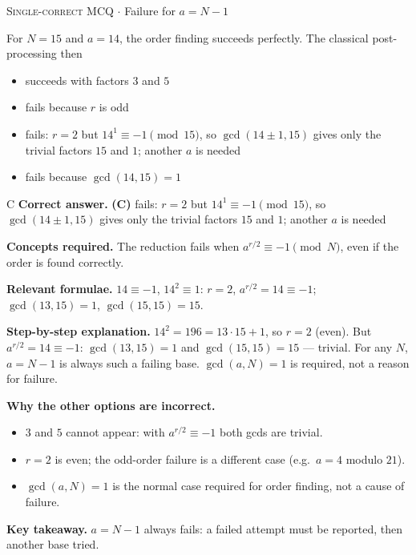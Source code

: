 \documentclass[11pt,a4paper]{article}
\newcommand{\optlabel}[1]{\textbf{(#1)}}
\newcommand{\correctlabel}[1]{\textcolor{okgreen}{\textbf{(#1)}\,\ding{51}}}
\newenvironment{qitem}[1]{\begin{list}{}{\setlength{\leftmargin}{3.3em}\setlength{\labelwidth}{3.1em}%
  \setlength{\labelsep}{0.2em}\setlength{\topsep}{3pt}\setlength{\parsep}{3pt}}\item[\textbf{Q.#1}\hfill]}{\end{list}}
\newcommand{\qsep}{\par\vspace{2pt}{\color{black!15}\hrule}\vspace{4pt}}
\newcommand{\qmeta}[2]{{\footnotesize\color{black!60}\textsc{#1} \;$\cdot$\; #2}\par}
\begin{document}
\begin{qitem}{43}
\qmeta{Single-correct MCQ}{Failure for $a = N - 1$}
For $N = 15$ and $a = 14$, the order finding succeeds perfectly. The classical post-processing then
\begin{itemize}[leftmargin=2.6em, labelsep=0.4em, itemsep=2pt, topsep=3pt]
\item[\optlabel{A}] succeeds with factors $3$ and $5$
\item[\optlabel{B}] fails because $r$ is odd
\item[\correctlabel{C}] fails: $r = 2$ but $14^{1} \equiv -1 \pmod{15}$, so $\gcd(14 \pm 1, 15)$ gives only the trivial factors $15$ and $1$; another $a$ is needed
\item[\optlabel{D}] fails because $\gcd(14, 15) = 1$
\end{itemize}
\end{qitem}
\begin{solbox}{C}
\textbf{\color{brand}Correct answer.} \textcolor{okgreen}{\textbf{(C)}} fails: $r = 2$ but $14^{1} \equiv -1 \pmod{15}$, so $\gcd(14 \pm 1, 15)$ gives only the trivial factors $15$ and $1$; another $a$ is needed

\textbf{\color{brand}Concepts required.} The reduction fails when $a^{r/2} \equiv -1 \pmod N$, even if the order is found correctly.

\textbf{\color{brand}Relevant formulae.} $14 \equiv -1$, $14^2 \equiv 1$: $r = 2$, $a^{r/2} = 14 \equiv -1$; $\gcd(13, 15) = 1$, $\gcd(15, 15) = 15$.

\textbf{\color{brand}Step-by-step explanation.} $14^2 = 196 = 13\cdot15 + 1$, so $r = 2$ (even). But $a^{r/2} = 14 \equiv -1$: $\gcd(13, 15) = 1$ and $\gcd(15, 15) = 15$ --- trivial. For any $N$, $a = N - 1$ is always such a
failing base. $\gcd(a, N) = 1$ is required, not a reason for failure.

\textbf{\color{brand}Why the other options are incorrect.}
\begin{itemize}[leftmargin=2.4em, itemsep=1pt, topsep=2pt]
\item[\textbf{(A)}] $3$ and $5$ cannot appear: with $a^{r/2} \equiv -1$ both gcds are trivial.
\item[\textbf{(B)}] $r = 2$ is even; the odd-order failure is a different case (e.g.\ $a = 4$ modulo $21$).
\item[\textbf{(D)}] $\gcd(a, N) = 1$ is the normal case required for order finding, not a cause of failure.
\end{itemize}
\textbf{\color{brand}Key takeaway.} $a = N - 1$ always fails: a failed attempt must be reported, then another base tried.
\end{solbox}
\qsep
\end{document}

